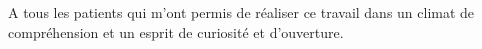 A tous les patients qui m'ont permis de réaliser ce travail dans un climat de compréhension et un esprit de curiosité et d'ouverture.














